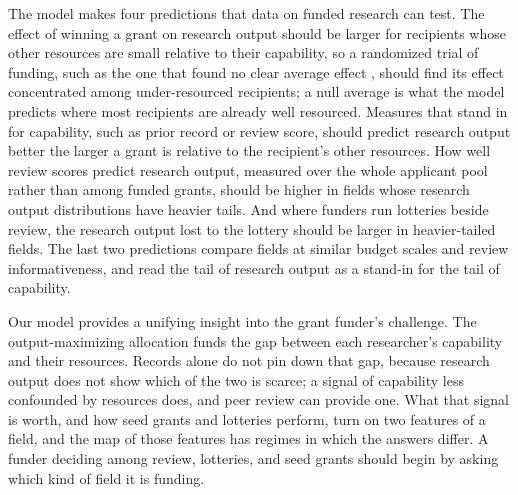 \documentclass[article, 11pt, reqno]{amsart}
\theoremstyle{named}
\begin{document}
The model makes four predictions that data on funded research can test. The effect of winning a grant on research output should be larger for recipients whose other resources are small relative to their capability, so a randomized trial of funding, such as the one that found no clear average effect \citep{Barnett2024}, should find its effect concentrated among under-resourced recipients; a null average is what the model predicts where most recipients are already well resourced. Measures that stand in for capability, such as prior record or review score, should predict research output better the larger a grant is relative to the recipient's other resources. How well review scores predict research output, measured over the whole applicant pool rather than among funded grants, should be higher in fields whose research output distributions have heavier tails. And where funders run lotteries beside review, the research output lost to the lottery should be larger in heavier-tailed fields. The last two predictions compare fields at similar budget scales and review informativeness, and read the tail of research output as a stand-in for the tail of capability.

Our model provides a unifying insight into the grant funder's challenge. The output-maximizing allocation funds the gap between each researcher's capability and their resources. Records alone do not pin down that gap, because research output does not show which of the two is scarce; a signal of capability less confounded by resources does, and peer review can provide one. What that signal is worth, and how seed grants and lotteries perform, turn on two features of a field, and the map of those features has regimes in which the answers differ. A funder deciding among review, lotteries, and seed grants should begin by asking which kind of field it is funding.
\end{document}
